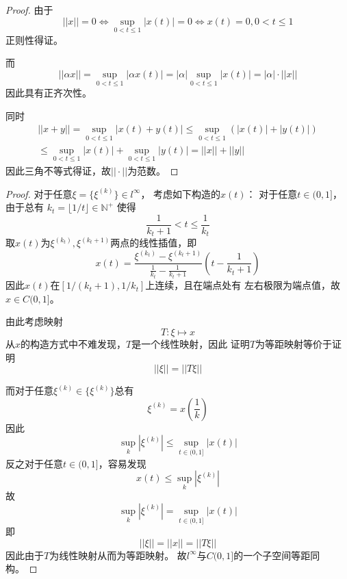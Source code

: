 \documentclass[cn]{homework}
\begin{document}
    \problem
    \begin{subproblem}[(\arabic*)]
        \item
        \begin{proof}
            由于
            \[||x||=0\Leftrightarrow\sup_{0<t\leq 1}|x(t)|=0
            \Leftrightarrow x(t)=0,0<t\leq 1\]
            正则性得证。

            而
            \[||\alpha x||=\sup_{0<t\leq 1}|\alpha x(t)|
            =|\alpha|\sup_{0<t\leq 1}|x(t)|=|\alpha|\cdot||x||\]
            因此具有正齐次性。

            同时
            \begin{multline*}
                ||x+y||=\sup_{0<t\leq 1}|x(t)+y(t)|
                \leq\sup_{0<t\leq 1}(|x(t)|+|y(t)|)\\
                \leq\sup_{0<t\leq 1}|x(t)|+\sup_{0<t\leq 1}|y(t)|
                =||x||+||y||
            \end{multline*}
            因此三角不等式得证，故$||\cdot||$为范数。
        \end{proof}

        \item
        \begin{proof}
            对于任意$\xi=\{\xi^{(k)}\}\in l^\infty$，
            考虑如下构造的$x(t)$：
            对于任意$t\in(0,1]$，由于总有
            $k_t=\lfloor1/t\rfloor\in\mathbb N^+$
            使得
            \[\frac{1}{k_t+1}<t\leq\frac{1}{k_t}\]
            取$x(t)$为$\xi^{(k_t)},\xi^{(k_t+1)}$两点的线性插值，即
            \[x(t)=\frac{\xi^{(k_t)}-\xi^{(k_t+1)}}{\frac{1}{k_t}-\frac{1}{k_t+1}}
            \left(t-\frac{1}{k_t+1}\right)\]
            因此$x(t)$在$[1/(k_t+1),1/k_t]$上连续，且在端点处有
            左右极限为端点值，故$x\in C(0,1]$。

            由此考虑映射
            \[T:\xi\mapsto x\]
            从$x$的构造方式中不难发现，$T$是一个线性映射，因此
            证明$T$为等距映射等价于证明
            \[||\xi||=||T\xi||\]

            而对于任意$\xi^{(k)}\in\{\xi^{(k)}\}$总有
            \[\xi^{(k)}=x\left(\frac{1}{k}\right)\]
            因此
            \[\sup_{k}|\xi^{(k)}|\leq\sup_{t\in(0,1]}|x(t)|\]
            反之对于任意$t\in(0,1]$，容易发现
            \[x(t)\leq\sup_{k}|\xi^{(k)}|\]
            故
            \[\sup_{k}|\xi^{(k)}|=\sup_{t\in(0,1]}|x(t)|\]
            即
            \[||\xi||=||x||=||T\xi||\]
            因此由于$T$为线性映射从而为等距映射。
            故$l^\infty$与$C(0,1]$的一个子空间等距同构。
        \end{proof}
    \end{subproblem}
\end{document}
